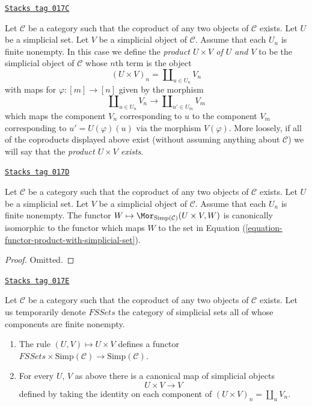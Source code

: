 \begin{definition}
\label{simplicial-definition-product-with-simplicial-set}
\href{https://stacks.math.columbia.edu/tag/017C}{\texttt{Stacks tag 017C}}

Let $\mathcal{C}$ be a category such that the coproduct of
any two objects of $\mathcal{C}$ exists. Let
$U$ be a simplicial set. Let $V$ be a simplicial
object of $\mathcal{C}$. Assume that each $U_n$ is
finite nonempty. In this case we define
the {\it product $U \times V$ of $U$ and $V$}
to be the simplicial object of $\mathcal{C}$ whose
$n$th term is the object
$$
(U \times V)_n = \coprod\nolimits_{u\in U_n} V_n
$$
with maps for $\varphi : [m] \to [n]$ given by the
morphism
$$
\coprod\nolimits_{u\in U_n} V_n
\longrightarrow
\coprod\nolimits_{u'\in U_m} V_m
$$
which maps the component $V_n$ corresponding to $u$ to the
component $V_m$ corresponding to $u' = U(\varphi)(u)$
via the morphism $V(\varphi)$.
More loosely, if all of the coproducts displayed above
exist (without assuming anything about $\mathcal{C}$)
we will say that the {\it product $U \times V$ exists}.
\end{definition}

\begin{lemma}
\label{simplicial-lemma-check-product-with-simplicial-set}
\href{https://stacks.math.columbia.edu/tag/017D}{\texttt{Stacks tag 017D}}

Let $\mathcal{C}$ be a category such that the coproduct of
any two objects of $\mathcal{C}$ exists. Let
$U$ be a simplicial set. Let $V$ be a simplicial
object of $\mathcal{C}$. Assume that each $U_n$ is
finite nonempty. The functor
$W \mapsto \Mor_{\text{Simp}(\mathcal{C})}(U \times V, W)$
is canonically isomorphic to the functor which
maps $W$ to the set in
Equation (\ref{equation-functor-product-with-simplicial-set}).
\end{lemma}

\begin{proof}
Omitted.
\end{proof}

\begin{lemma}[Back to U]
\label{simplicial-lemma-back-to-U}
\href{https://stacks.math.columbia.edu/tag/017E}{\texttt{Stacks tag 017E}}

Let $\mathcal{C}$ be a category such that the coproduct of
any two objects of $\mathcal{C}$ exists. Let us temporarily
denote $\textit{FSSets}$ the category of simplicial sets
all of whose components are finite nonempty.
\begin{enumerate}
\item The rule $(U, V) \mapsto U \times V$
defines a functor
$\textit{FSSets} \times \text{Simp}(\mathcal{C})
\to \text{Simp}(\mathcal{C})$.
\item For every $U$, $V$ as above
there is a canonical map of simplicial objects
$$
U \times V \longrightarrow V
$$
defined by taking the identity on each component of
$(U \times V)_n = \coprod_u V_n$.
\end{enumerate}
\end{lemma}

